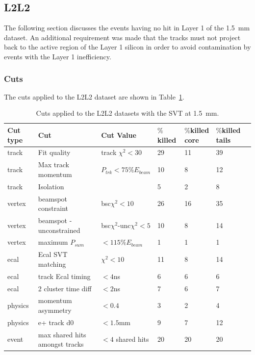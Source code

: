 \subsection{L2L2}

The following section discusses the events having no hit in Layer 1 of the 1.5~mm dataset. An additional requirement was made that the tracks must not project back to the active region of the Layer 1 silicon in order to avoid contamination by events with the Layer 1 inefficiency. 

\subsubsection{Cuts}

The cuts applied to the L2L2 dataset are shown in Table~\ref{l2l2_cuts_1p5}.

\begin{table}[H]
\caption{Cuts applied to the L2L2 datasets with the SVT at 1.5~mm.}
\label{l2l2_cuts_1p5}
\centering
\begin{tabular}{lllllll}
\toprule
Cut type & Cut & Cut Value &  $\%$killed &  $\%$killed core & $\%$killed tails\\
\midrule
track & Fit quality & track $\chi^{2}<30$ & 29 & 11 & 39 \\
track & Max track momentum &  $P_{trk}<75\%E_{beam}$ & 10 & 8 & 12 \\
track & Isolation &   & 5 & 2 & 8 \\
vertex & beamspot constraint & bsc$\chi^{2}<10$  & 26 & 16 & 35 \\
vertex & beamspot - unconstrained & bsc$\chi^{2}$-unc$\chi^2<5$  & 10 & 8 & 14 \\
vertex & maximum $P_{sum}$ &  $<115\%E_{beam}$ & 1 & 1 & 1 \\
ecal & Ecal SVT matching & $\chi^2<10$  & 11 & 8 & 14 \\
ecal & track Ecal timing & $<4$ns  & 6 & 6 & 6 \\
ecal & 2 cluster time diff & $<2$ns  & 7 & 6 & 7 \\
physics & momentum asymmetry & $<0.4$  & 3 & 2 & 4 \\
physics & e+ track d0 & $<1.5$mm  & 9 & 7 & 12 \\
event & max shared hits amongst tracks & $<4$ shared hits  & 20 & 20 & 20 \\
\bottomrule
\end{tabular}
\end{table}

